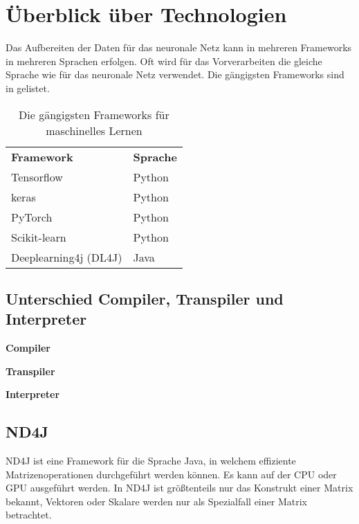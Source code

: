 
\chapter{Überblick über Technologien}

Das Aufbereiten der Daten für das neuronale Netz kann in mehreren Frameworks in mehreren Sprachen erfolgen.
Oft wird für das Vorverarbeiten die gleiche Sprache wie für das neuronale Netz verwendet.
Die gängigsten Frameworks sind in  gelistet.

\begin{table}[H]
	\centering
	\begin{tabular}{ | p{3cm} | p{3cm} | }
		\hline \rowcolor{gray!15}
		\textbf{Framework} & \textbf{Sprache} \\ \hhline{|=|=|}
		Tensorflow & Python \\ \hline
		keras & Python \\ \hline
		PyTorch & Python \\ \hline
		Scikit-learn & Python \\ \hline
		Deeplearning4j (DL4J) & Java \\ \hline
	\end{tabular}
	\caption{Die gängigsten Frameworks für maschinelles Lernen}
	\label{tab:Frameworks}
\end{table}

\section{Unterschied Compiler, Transpiler und Interpreter}
\begin{description}
	\item{\textbf{Compiler}}
	\item{\textbf{Transpiler}}
	\item{\textbf{Interpreter}}
\end{description}

\section{ND4J}
ND4J ist eine Framework für die Sprache Java, in welchem effiziente Matrizenoperationen durchgeführt werden können.
Es kann auf der \ac{CPU} oder \ac{GPU} ausgeführt werden.
In ND4J ist größtenteils nur das Konstrukt einer Matrix bekannt, Vektoren oder Skalare werden nur als Spezialfall einer Matrix betrachtet.

\endinput
